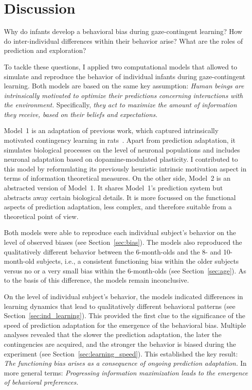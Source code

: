 \documentclass[a4paper]{scrreprt}
\begin{document}
\chapter{Discussion}
\label{ch:disc}

Why do infants develop a behavioral bias during gaze-contingent learning? How do inter-individual differences within their behavior arise? What are the roles of prediction and exploration?

To tackle these questions, I applied two computational models that allowed to simulate and reproduce the behavior of individual infants during gaze-contingent learning. Both models are based on the same key assumption: \textit{Human beings are intrinsically motivated to optimize their predictions concerning interactions with the environment.} Specifically, \textit{they act to maximize the amount of information they receive, based on their beliefs and expectations.}

Model~1 is an adaptation of previous work, which captured intrinsically motivated contingency learning in rats~\cite{bg13}. Apart from prediction adaptation, it simulates biological processes on the level of neuronal populations and includes neuronal adaptation based on dopamine-modulated plasticity. I contributed to this model by reformulating its previously heuristic intrinsic motivation aspect in terms of information theoretical measures. 
On the other side, Model~2 is an abstracted version of Model~1. It shares Model~1's prediction system but abstracts away certain biological details. It is more focussed on the functional aspects of prediction adaptation, less complex, and therefore suitable from a theoretical point of view.

Both models were able to reproduce each individual subject's behavior on the level of observed biases (see Section~\ref{sec:bias}). The models also reproduced the qualitatively different behavior between the 6-month-olds and the 8- and 10-month-old subjects, i.e., a consistent functioning bias within the older subjects versus no or a very small bias within the 6-month-olds (see Section~\ref{sec:age}). As to the basis of this difference, the models remain inconclusive.

On the level of individual subject's behavior, the models indicated differences in learning dynamics that lead to qualitatively different behavioral patterns (see Section~\ref{sec:ind_learning}). This provided the first clue to the significance of the speed of prediction adaptation for the emergence of the behavioral bias. Multiple analyses revealed that the slower the prediction adaptation, the later the contingencies are acquired, and the stronger the behavior is biased during the experiment (see Section~\ref{sec:learning_speed}). This established the key result: \textit{The functioning bias arises as a consequence of ongoing prediction adaptation.} In more general terms: \textit{Progressing information maximization leads to the emergence of behavioral preferences.}
\end{document}
